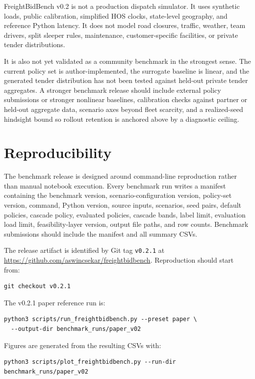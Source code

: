 \documentclass[11pt]{article}
\begin{document}
FreightBidBench v0.2 is not a production dispatch simulator. It uses synthetic
loads, public calibration, simplified HOS clocks, state-level geography, and
reference Python latency. It does not model road closures, traffic, weather,
team drivers, split sleeper rules, maintenance, customer-specific facilities,
or private tender distributions.

It is also not yet validated as a community benchmark in the strongest sense.
The current policy set is author-implemented, the surrogate baseline is linear,
and the generated tender distribution has not been tested against held-out
private tender aggregates. A stronger benchmark release should include
external policy submissions or stronger nonlinear baselines, calibration checks
against partner or held-out aggregate data, scenario axes beyond fleet
scarcity, and a realized-seed hindsight bound so rollout retention is anchored
above by a diagnostic ceiling.

\section{Reproducibility}

The benchmark release is designed around command-line reproduction rather than
manual notebook execution. Every benchmark run writes a manifest containing the
benchmark version, scenario-configuration version, policy-set version, command,
Python version, source inputs, scenarios, seed pairs, default policies, cascade
policy, evaluated policies, cascade bands, label limit, evaluation load limit,
feasibility-layer version, output file paths, and row counts. Benchmark
submissions should include the manifest and all summary CSVs.

The release artifact is identified by Git tag \texttt{v0.2.1} at
\url{https://github.com/aswincsekar/freightbidbench}. Reproduction should start
from:
\begin{verbatim}
git checkout v0.2.1
\end{verbatim}

The v0.2.1 paper reference run is:
\begin{verbatim}
python3 scripts/run_freightbidbench.py --preset paper \
  --output-dir benchmark_runs/paper_v02
\end{verbatim}

Figures are generated from the resulting CSVs with:
\begin{verbatim}
python3 scripts/plot_freightbidbench.py --run-dir benchmark_runs/paper_v02
\end{verbatim}
\end{document}
